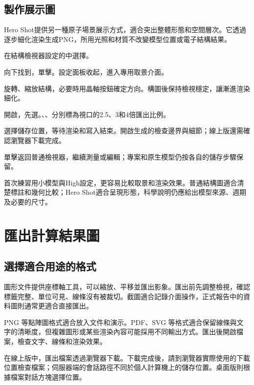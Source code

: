 \subsection{製作展示圖}

Hero Shot提供另一種原子場景展示方式，適合突出整體形態和空間層次。它透過逐步細化渲染生成PNG，所用光照和材質不改變模型位置或電子結構結果。

\begin{steps}
\item 在結構檢視器設定的中選擇。
\item 向下找到，單擊。設定面板收起，進入專用取景介面。
\item 旋轉、縮放結構，必要時用晶軸按鈕確定方向。構圖後保持檢視穩定，讓漸進渲染細化。
\item 開啟，先選。、、分別標為視口的2.5、3和4倍匯出比例。
\item 選擇儲存位置，等待渲染和寫入結束。開啟生成的檢查邊界與細節；線上版還需確認瀏覽器下載完成。
\item 單擊返回普通檢視器，繼續測量或編輯；專案和原生模型仍按各自的儲存步驟保留。
\end{steps}

首次練習用小模型與High設定，更容易比較取景和渲染效果。普通結構圖適合清楚標註和幾何比較；Hero Shot適合呈現形態，科學說明仍應給出模型來源、週期及必要的尺寸。

\section{匯出計算結果圖}

\subsection{選擇適合用途的格式}

圖形文件提供座標軸工具，可以縮放、平移並匯出影象。匯出前先調整檢視，確認標籤完整、單位可見、線條沒有被裁切。截圖適合記錄介面操作，正式報告中的資料圖則通常更適合直接匯出。

PNG 等點陣圖格式適合放入文件和演示。PDF、SVG 等格式適合保留線條與文字的清晰度，但複雜圖形或某些渲染內容可能採用不同輸出方式。匯出後開啟檔案，檢查文字、線條和渲染效果。

在線上版中，匯出檔案透過瀏覽器下載。下載完成後，請到瀏覽器實際使用的下載位置檢查檔案；伺服器端的會話路徑不同於個人計算機上的儲存位置。桌面版則根據檔案對話方塊選擇位置。

